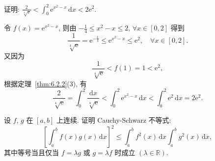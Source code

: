 \begin{example}\label{ex:6.2.6}
证明: $\frac{2}{\sqrt[4]{\mathrm{e}}}<\int_{0}^{2}\mathrm{e}^{x^{2}-x}\,\mathrm{d}x<2\mathrm{e}^{2}$.
\end{example}

\begin{solution}
令 $f(x)=\mathrm{e}^{x^{2}-x}$, 则由 $-\frac{1}{4}\leqslant x^{2}-x\leqslant 2$, $\forall x\in[0,2]$ 得到
\[
\frac{1}{\sqrt[4]{\mathrm{e}}}=\mathrm{e}^{-\frac{1}{4}}\leqslant\mathrm{e}^{x^{2}-x}\leqslant\mathrm{e}^{2},\quad\forall x\in[0,2].
\]
又因为
\[
\frac{1}{\sqrt[4]{\mathrm{e}}}<f(1)=1<\mathrm{e}^{2},
\]
根据定理~\ref{thm:6.2.2}(3), 有
\[
\frac{2}{\sqrt[4]{\mathrm{e}}}=\int_{0}^{2}\frac{\mathrm{d}x}{\sqrt[4]{\mathrm{e}}}<\int_{0}^{2}\mathrm{e}^{x^{2}-x}\,\mathrm{d}x<\int_{0}^{2}\mathrm{e}^{2}\,\mathrm{d}x=2\mathrm{e}^{2}.
\]
\end{solution}

\begin{example}\label{ex:6.2.7}
设 $f$, $g$ 在 $[a,b]$ 上连续. 证明 Cauchy-Schwarz 不等式:
\[
\left[\int_{a}^{b}f(x)g(x)\,\mathrm{d}x\right]^{2}\leqslant\int_{a}^{b}f^{2}(x)\,\mathrm{d}x\int_{a}^{b}g^{2}(x)\,\mathrm{d}x,
\]
其中等号当且仅当 $f=\lambda g$ 或 $g=\lambda f$ 时成立 $(\lambda\in\mathbb{R})$.
\end{example}

